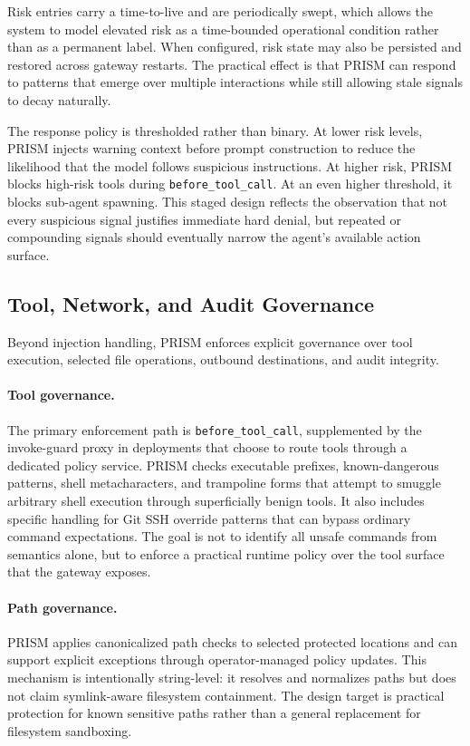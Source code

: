 Risk entries carry a time-to-live and are periodically swept, which allows the system to model elevated risk as a time-bounded operational condition rather than as a permanent label. When configured, risk state may also be persisted and restored across gateway restarts. The practical effect is that PRISM can respond to patterns that emerge over multiple interactions while still allowing stale signals to decay naturally.

The response policy is thresholded rather than binary. At lower risk levels, PRISM injects warning context before prompt construction to reduce the likelihood that the model follows suspicious instructions. At higher risk, PRISM blocks high-risk tools during \texttt{before\_tool\_call}. At an even higher threshold, it blocks sub-agent spawning. This staged design reflects the observation that not every suspicious signal justifies immediate hard denial, but repeated or compounding signals should eventually narrow the agent's available action surface.

\subsection{Tool, Network, and Audit Governance}

Beyond injection handling, PRISM enforces explicit governance over tool execution, selected file operations, outbound destinations, and audit integrity.

\paragraph{Tool governance.} The primary enforcement path is \texttt{before\_tool\_call}, supplemented by the invoke-guard proxy in deployments that choose to route tools through a dedicated policy service. PRISM checks executable prefixes, known-dangerous patterns, shell metacharacters, and trampoline forms that attempt to smuggle arbitrary shell execution through superficially benign tools. It also includes specific handling for Git SSH override patterns that can bypass ordinary command expectations. The goal is not to identify all unsafe commands from semantics alone, but to enforce a practical runtime policy over the tool surface that the gateway exposes.

\paragraph{Path governance.} PRISM applies canonicalized path checks to selected protected locations and can support explicit exceptions through operator-managed policy updates. This mechanism is intentionally string-level: it resolves and normalizes paths but does not claim symlink-aware filesystem containment. The design target is practical protection for known sensitive paths rather than a general replacement for filesystem sandboxing.

